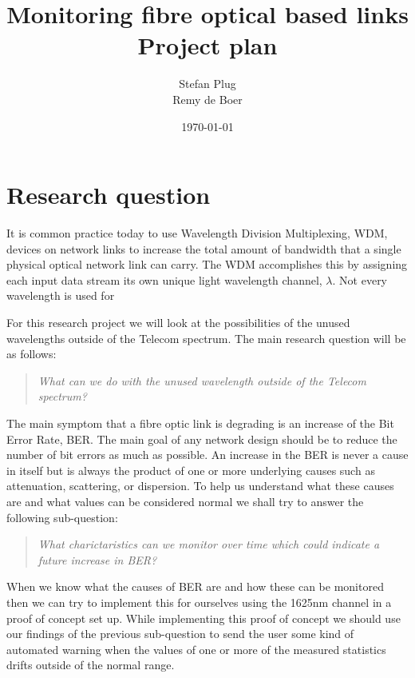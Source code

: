 \documentclass{article}
\begin{document}
\title{Monitoring fibre optical based links\\Project plan}
\author{Stefan Plug\\Remy de Boer}
\date{\today}
\maketitle

\section{Research question}
It is common practice today to use Wavelength Division Multiplexing, WDM, devices on network links to increase the total amount of bandwidth that a single physical optical network link can carry. The WDM accomplishes this by assigning each input data stream its own unique light wavelength channel, $\lambda$. Not every wavelength is used for 

For this research project we will look at the possibilities of the unused wavelengths outside of the Telecom spectrum. 
The main research question will be as follows:
\begin{quote}
\textit{
What can we do with the unused wavelength outside of the Telecom spectrum?
}
\end{quote}

The main symptom that a fibre optic link is degrading is an increase of the Bit Error Rate, BER.
The main goal of any network design should be to reduce the number of bit errors as much as possible.
An increase in the BER is never a cause in itself but is always the product of one or more underlying causes such as attenuation, scattering, or dispersion. To help us understand what these causes are and what values can be considered normal we shall try to answer the following sub-question:
\begin{quote}
\textit{
What charictaristics can we monitor over time which could indicate a future increase in BER?
}
\end{quote}
When we know what the causes of BER are and how these can be monitored then we can try to implement this for ourselves using the 1625nm channel in a proof of concept set up. 
While implementing this proof of concept we should use our findings of the previous sub-question to send the user some kind of automated warning when the values of one or more of the measured statistics drifts outside of the normal range.
\end{document}
